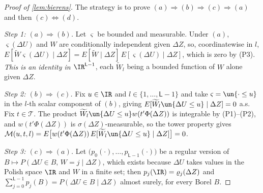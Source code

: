 \begin{proof}[Proof of \cref{lem:bierens}]
The strategy is to prove $(a)\Rightarrow(b)\Rightarrow(c)\Rightarrow(a)$ and then
$(c)\Leftrightarrow(d)$.

\emph{Step 1: $(a)\Rightarrow(b)$.}
Let $\varsigma$ be bounded and measurable. Under $(a)$, $\varsigma(\Delta U)$ and $W$ are conditionally
independent given $\Delta Z$, so, coordinatewise in $l$,
$E[\widetilde W\varsigma(\Delta U)\mid\Delta Z]=E[\widetilde W\mid\Delta Z]\,E[\varsigma(\Delta U)\mid\Delta Z]$,
which is zero by (P3). \emph{This is an identity in $\IR^{\mathsf L-1}$}, each $\widetilde W_l$ being a
bounded function of $W$ alone given $\Delta Z$.

\emph{Step 2: $(b)\Rightarrow(c)$.}
Fix $u\in\IR$ and $l\in\{1,\dots,\mathsf L-1\}$ and take $\varsigma=\un\{\cdot\le u\}$ in the $l$-th
scalar component of $(b)$, giving
$E[\widetilde W_l\un\{\Delta U\le u\}\mid\Delta Z]=0$ a.s. Fix $t\in\mathcal T$. The product
$\widetilde W_l\un\{\Delta U\le u\}w(t'\Phi(\Delta Z))$ is integrable by (P1)--(P2), and
$w(t'\Phi(\Delta Z))$ is $\sigma(\Delta Z)$-measurable, so the tower property gives
$\mathcal M(u,t,l)=E\big[w(t'\Phi(\Delta Z))\,E[\widetilde W_l\un\{\Delta U\le u\}\mid\Delta Z]\big]=0$.

\emph{Step 3: $(c)\Rightarrow(a)$.}
Let $\big(p_0(\cdot),\dots,p_{\mathsf L-1}(\cdot)\big)$ be a regular version of
$B\mapsto P(\Delta U\in B,\,W=j\mid\Delta Z)$, which exists because $\Delta U$ takes values in the
Polish space $\IR$ and $W$ in a finite set; then $p_j(\IR)=\varrho_j(\Delta Z)$ and
$\sum_{j=0}^{\mathsf L-1}p_j(B)=P(\Delta U\in B\mid\Delta Z)$ almost surely, for every Borel $B$.


\end{proof}
